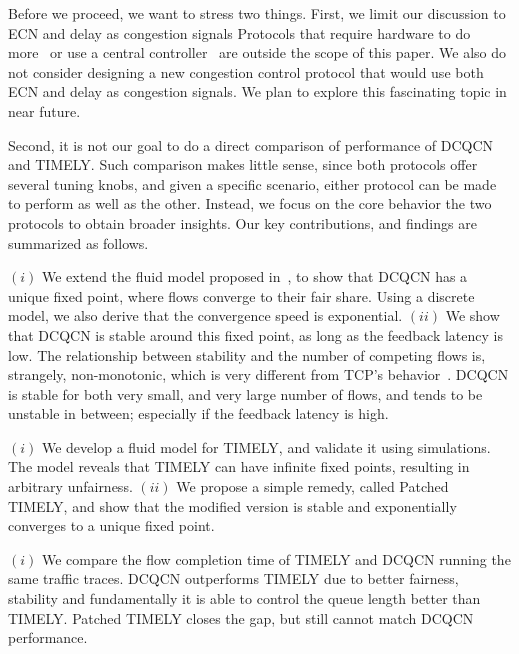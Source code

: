 
Before we proceed, we want to stress two things.  First, we limit our discussion
to ECN and delay as congestion signals  Protocols 
that require hardware to do more~\cite{pfabric,rcp,katabi2002congestion} or use a central
controller~\cite{perry2014fastpass,deadline} are outside the scope of this
paper. We also do not consider designing a new congestion control protocol that
would use both ECN and delay as congestion signals. We plan to explore this
fascinating topic in near future.

Second, it is not our goal to do a direct comparison of performance of DCQCN and
TIMELY.  Such comparison makes little sense, since both protocols offer several
tuning knobs, and given a specific scenario, either protocol can be made to
perform as well as the other. Instead, we focus on the core behavior the two
protocols to obtain broader insights.  Our key contributions, and findings are
summarized as follows.

 $(i)$ We extend the fluid model proposed in~\cite{dcqcn}, to show
that DCQCN has a unique fixed point, where flows converge to their fair share.
Using a discrete model, we also derive that the convergence speed is exponential.
$(ii)$ We show that DCQCN is stable around this fixed point, as long as the
feedback latency is low. The relationship between stability and the number of
competing flows is, strangely, non-monotonic, which is very different from TCP's
behavior~\cite{misra:TAC2002}. DCQCN is stable for both very small, and very
large number of flows, and tends to be unstable in between; especially if the
feedback latency is high.

 $(i)$ We develop a fluid model for TIMELY, and validate it using
simulations. The model reveals that TIMELY can have infinite fixed points,
resulting in arbitrary unfairness.  $(ii)$ We propose a simple remedy, called Patched TIMELY, and show
that the modified version is stable and exponentially converges to a unique fixed 
point. 

 $(i)$ We compare the flow completion time of TIMELY and 
DCQCN running the same traffic traces. DCQCN outperforms TIMELY
due to better fairness, stability and fundamentally it is able to
control the queue length better than TIMELY. Patched TIMELY closes the gap, but 
still cannot match DCQCN performance. 

